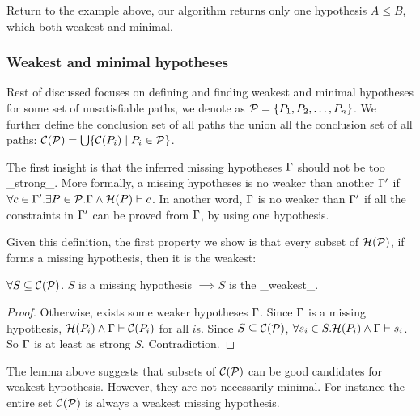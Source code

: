 Return to the example above, our algorithm returns only one hypothesis
$A\leq B$, which both weakest and minimal.
%
% 
% 
% 
% 
\subsubsection{Weakest and minimal hypotheses}

Rest of discussed focuses on defining and finding weakest and minimal
hypotheses for some set of unsatisfiable paths, we denote as
$\mathcal{P}=\{P_1, P_2, \dots, P_n\}$. We further define the conclusion
set of all paths the union all the conclusion set of all paths:
$\mathcal{C}(\mathcal{P})=\bigcup\{\mathcal{C}(P_i) \mid P_i\in \mathcal{P}\}$.

The first insight is that the inferred missing hypotheses $\Gamma$ should
not be too _strong_. More formally, a missing hypotheses is no weaker
than another $\Gamma'$ if $\forall c\in \Gamma'.\exists P\in \mathcal{P}.  \Gamma
\land \mathcal{H}(P) \vdash c$. In another word, $\Gamma$ is no weaker than
$\Gamma'$ if all the constraints in $\Gamma'$ can be proved from $\Gamma$, by
using one hypothesis.

Given this definition, the first property we show is that every subset
of $\mathcal{H}(\mathcal{P})$, if forms a missing hypothesis, then it is
the weakest:
%
\begin{Lemma}
\label{lemma:weakest}
$\forall S\subseteq \mathcal{C}(\mathcal{P})$. $S$ is a missing hypothesis
$\implies S$ is the _weakest_.
\end{Lemma}
\begin{proof}
Otherwise, exists some weaker hypotheses $\Gamma$. Since $\Gamma$ is a missing
hypothesis, $\mathcal{H}(P_i) \land \Gamma\vdash \mathcal{C}(P_i)$  for all
$i$s. Since $S\subseteq \mathcal{C}(\mathcal{P})$, $\forall s_i\in S.
\mathcal{H}(P_i) \land \Gamma\vdash s_i$. So $\Gamma$ is at least as strong
$S$. Contradiction.
\end{proof}
%
%
The lemma above suggests that subsets of $\mathcal{C}(\mathcal{P})$ can be
good candidates for weakest hypothesis. However, they are not
necessarily minimal. For instance the entire set $\mathcal{C}(\mathcal{P})$
is always a weakest missing hypothesis. 


